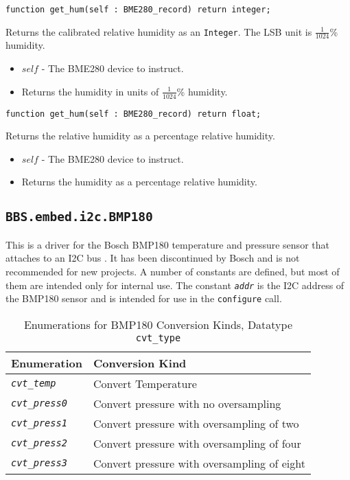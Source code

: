 \documentclass[10pt, openany]{book}
\newcommand{\indextype}[1]{\index[type]{#1}}
\newcommand{\indexfunc}[1]{\index[func]{#1}}
\newcommand{\package}[1]{\texttt{#1}}
\newcommand{\function}[1]{\texttt{#1}}
\newcommand{\constant}[1]{\emph{\texttt{#1}}}
\newcommand{\datatype}[1]{\texttt{#1}}
\begin{document}
\begin{lstlisting}
function get_hum(self : BME280_record) return integer;
\end{lstlisting}
\indexfunc{get\_hum}
Returns the calibrated relative humidity as an \datatype{Integer}.  The LSB unit is $\frac{1}{1024}$\% humidity.
\begin{itemize}
  \item $self$ - The BME280 device to instruct.
  \item Returns the humidity in units of $\frac{1}{1024}$\% humidity.
\end{itemize}

\begin{lstlisting}
function get_hum(self : BME280_record) return float;
\end{lstlisting}
\indexfunc{get\_hum}
Returns the relative humidity as a percentage relative humidity.
\begin{itemize}
  \item $self$ - The BME280 device to instruct.
  \item Returns the humidity as a percentage relative humidity.
\end{itemize}

\subsection{\package{BBS.embed.i2c.BMP180}}
This is a driver for the Bosch BMP180 temperature and pressure sensor that attaches to an I2C bus \cite{BMP180}.  It has been discontinued by Bosch and is not recommended for new projects.  A number of constants are defined, but most of them are intended only for internal use.  The constant \constant{addr} is the I2C address of the BMP180 sensor and is intended for use in the \function{configure} call.

\begin{table}[!h]
\begin{center}
  \begin{tabular}{l|l}
    Enumeration & Conversion Kind \\
    \hline
    \constant{cvt\_temp} & Convert Temperature \\
    \constant{cvt\_press0} & Convert pressure with no oversampling \\
    \constant{cvt\_press1} & Convert pressure with oversampling of two \\
    \constant{cvt\_press2} & Convert pressure with oversampling of four  \\
    \constant{cvt\_press3} & Convert pressure with oversampling of eight  \\
  \end{tabular}
  \caption{Enumerations for BMP180 Conversion Kinds, Datatype \datatype{cvt\_type}}
  \label{tbl:BMP180Conv}
  \indextype{cvt\_type}
\end{center}
\end{table}
\end{document}
